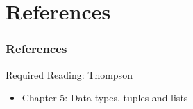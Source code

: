 \documentclass[dvipsnames]{beamer}
\theoremstyle{plain}
\begin{document}

\section*{References}

\begin{frame}
  \frametitle{References}

  \begin{block}{Required Reading: Thompson}
    \begin{itemize}
      \item Chapter 5: \alert{Data types, tuples and lists}
    \end{itemize}
  \end{block}
\end{frame}
\end{document}
